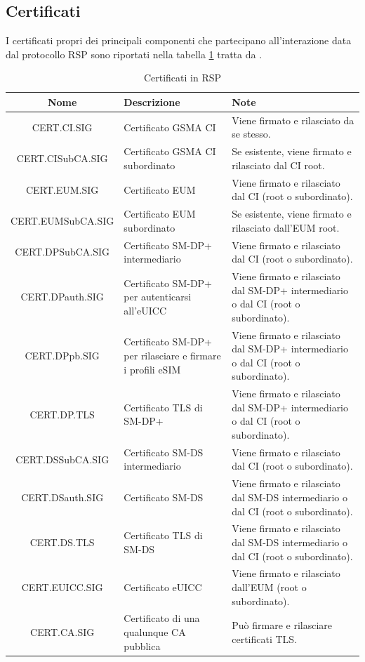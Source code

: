 \documentclass[10pt, twoside, openany]{book}
\begin{document}
\subsection{Certificati}
I certificati propri dei principali componenti che partecipano all'interazione data dal protocollo RSP sono riportati nella tabella \ref{tab:cert} tratta da \cite{GSMA-docs-new}.\\
\begin{table}[h!]
\begin{center}
\captionsetup{skip=4pt}
\caption{Certificati in RSP}
\label{tab:cert}
\begin{tabularx}{\textwidth}{|c|X|X|}
\hline
\textbf{Nome} & \textbf{Descrizione} & \textbf{Note}\\
\hline
CERT.CI.SIG & Certificato GSMA CI & Viene firmato e rilasciato da se stesso.\\
\hline
CERT.CISubCA.SIG & Certificato GSMA CI subordinato & Se esistente, viene firmato e rilasciato dal CI root.\\
\hline
CERT.EUM.SIG & Certificato EUM & Viene firmato e rilasciato dal CI (root o subordinato).\\
\hline
CERT.EUMSubCA.SIG & Certificato EUM subordinato & Se esistente, viene firmato e rilasciato dall'EUM root.\\
\hline
CERT.DPSubCA.SIG & Certificato SM-DP+ intermediario & Viene firmato e rilasciato dal CI (root o subordinato).\\
\hline
CERT.DPauth.SIG & Certificato SM-DP+ per autenticarsi all'eUICC & Viene firmato e rilasciato dal SM-DP+ intermediario o dal CI (root o subordinato).\\
\hline
CERT.DPpb.SIG & Certificato SM-DP+ per rilasciare e firmare i profili eSIM & Viene firmato e rilasciato dal SM-DP+ intermediario o dal CI (root o subordinato).\\
\hline
CERT.DP.TLS & Certificato TLS di SM-DP+ & Viene firmato e rilasciato dal SM-DP+ intermediario o dal CI (root o subordinato).\\
\hline
CERT.DSSubCA.SIG & Certificato SM-DS intermediario & Viene firmato e rilasciato dal CI (root o subordinato).\\
\hline
CERT.DSauth.SIG & Certificato SM-DS & Viene firmato e rilasciato dal SM-DS intermediario o dal CI (root o subordinato).\\
\hline
CERT.DS.TLS & Certificato TLS di SM-DS & Viene firmato e rilasciato dal SM-DS intermediario o dal CI (root o subordinato).\\
\hline
CERT.EUICC.SIG & Certificato eUICC & Viene firmato e rilasciato dall'EUM (root o subordinato).\\
\hline
CERT.CA.SIG & Certificato di una qualunque CA pubblica & Può firmare e rilasciare certificati TLS.\\
\hline
\end{tabularx}
\end{center}
\end{table}
\end{document}
